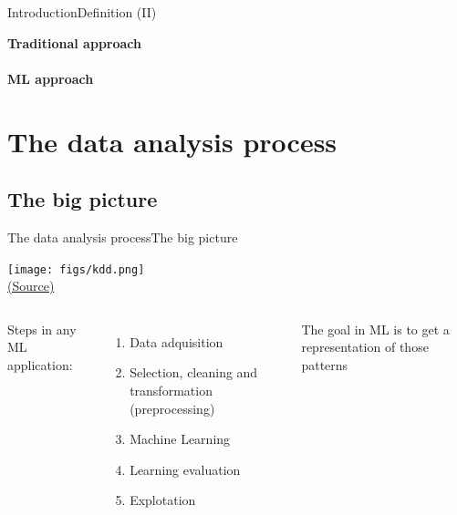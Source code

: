 \documentclass[10pt,compress]{beamer} %
\begin{document}
\begin{frame}{Introduction}{Definition (II)}
	\begin{center}
	\textbf{Traditional approach}\\
	\\
	\bigskip
	\textbf{ML approach}\\
	
	\end{center}	
\end{frame}

\section{The data analysis process}
\subsection{The big picture}
\begin{frame}{The data analysis process}{The big picture}
	\begin{center}
	\texttt{[image: figs/kdd.png]}\\
    \tiny{\href{https://www.researchgate.net/figure/The-steps-of-the-KDD-process_fig6_297734487}{(Source)}}
	\end{center}

	\begin{columns}
		Steps in any ML application:
		\begin{enumerate}
			\item Data adquisition
			\item Selection, cleaning and transformation (\alert{preprocessing})
			\item Machine Learning
			\item Learning evaluation
			\item Explotation
		\end{enumerate}

	   \begin{block}{}
	   		The goal in ML is to get a representation of those patterns
	   \end{block}
	\end{columns}
\end{frame}
\end{document}
